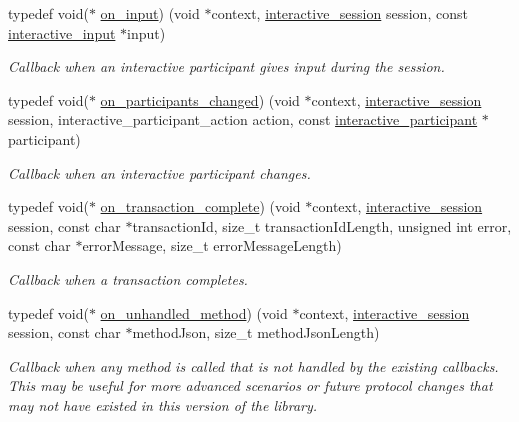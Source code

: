 \begin{DoxyCompactItemize}
typedef void($\ast$ \mbox{\hyperlink{group___interactivity_gabc1d56c93e90e83489bc9200a467a9b6}{on\+\_\+input}}) (void $\ast$context, \mbox{\hyperlink{group___interactivity_ga6d8819d38b8dc8994a2299cf22a65a31}{interactive\+\_\+session}} session, const \mbox{\hyperlink{structinteractive__input}{interactive\+\_\+input}} $\ast$input)
\begin{DoxyCompactList}\small\item\em Callback when an interactive participant gives input during the session. \end{DoxyCompactList}\item 
typedef void($\ast$ \mbox{\hyperlink{group___interactivity_ga37e53b2d79a8ef8dbb6adae640e53779}{on\+\_\+participants\+\_\+changed}}) (void $\ast$context, \mbox{\hyperlink{group___interactivity_ga6d8819d38b8dc8994a2299cf22a65a31}{interactive\+\_\+session}} session, interactive\+\_\+participant\+\_\+action action, const \mbox{\hyperlink{structinteractive__participant}{interactive\+\_\+participant}} $\ast$participant)
\begin{DoxyCompactList}\small\item\em Callback when an interactive participant changes. \end{DoxyCompactList}\item 
typedef void($\ast$ \mbox{\hyperlink{group___interactivity_gadd027ab4911a031b88ecd8603ed7cbd3}{on\+\_\+transaction\+\_\+complete}}) (void $\ast$context, \mbox{\hyperlink{group___interactivity_ga6d8819d38b8dc8994a2299cf22a65a31}{interactive\+\_\+session}} session, const char $\ast$transaction\+Id, size\+\_\+t transaction\+Id\+Length, unsigned int error, const char $\ast$error\+Message, size\+\_\+t error\+Message\+Length)
\begin{DoxyCompactList}\small\item\em Callback when a transaction completes. \end{DoxyCompactList}\item 
typedef void($\ast$ \mbox{\hyperlink{group___interactivity_ga1f1661f615bd28112daad64f95103a6a}{on\+\_\+unhandled\+\_\+method}}) (void $\ast$context, \mbox{\hyperlink{group___interactivity_ga6d8819d38b8dc8994a2299cf22a65a31}{interactive\+\_\+session}} session, const char $\ast$method\+Json, size\+\_\+t method\+Json\+Length)
\begin{DoxyCompactList}\small\item\em Callback when any method is called that is not handled by the existing callbacks. This may be useful for more advanced scenarios or future protocol changes that may not have existed in this version of the library. \end{DoxyCompactList}\item 

\end{DoxyCompactItemize}
